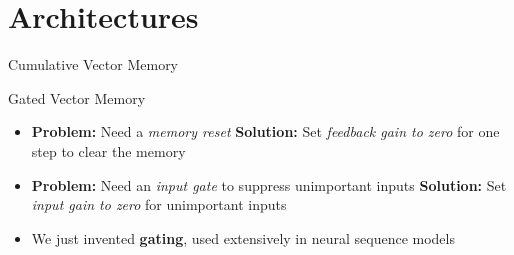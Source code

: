 % 


\section[\sectopts,toc={Architectures}]{Architectures}

\begin{slide}[\slideopts,toc={Vector Memory}]{Cumulative Vector Memory}
\vspace{-1em}
\vspace{-1em}
\end{slide}

\begin{slide}[\slideopts,toc={Gating}]{Gated Vector Memory}


\begin{itemize}
\item \textbf{Problem:} Need a \emph{memory reset}
\mpitem \textbf{Solution:} Set \emph{feedback gain to zero} for one step to clear the memory
\item[]
\mpitem \textbf{Problem:} Need an \emph{input gate} to suppress unimportant inputs
\mpitem \textbf{Solution:} Set \emph{input gain to zero} for unimportant inputs
\item[]
\mpitem We just invented \textbf{gating}, used extensively in neural sequence models
\end{itemize}

\end{slide}

